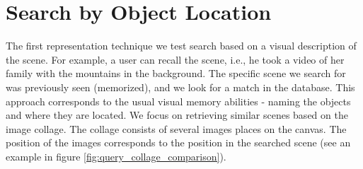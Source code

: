 

\chapter{Search by Object Location}
\label{ch:object_location}

The first representation technique we test search based on a visual description of the scene. For example, a user can recall the scene, i.e., he took a video of her family with the mountains in the background. The specific scene we search for was previously seen (memorized), and we look for a match in the database. This approach corresponds to the usual visual memory abilities - naming the objects and where they are located. We focus on retrieving similar scenes based on the image collage. The collage consists of several images places on the canvas. The position of the images corresponds to the position in the searched scene (see an example in figure \ref{fig:query_collage_comparison}).

